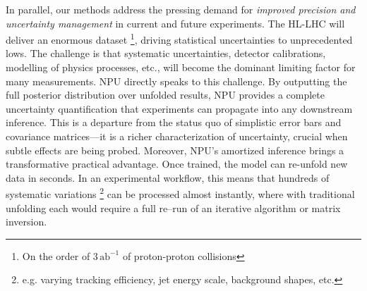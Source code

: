         In parallel, our methods address the pressing demand for \emph{improved precision and uncertainty management} in current and future experiments.
        The HL-LHC will deliver an enormous dataset \footnote{On the order of $3\,\text{ab}^{-1}$ of proton-proton collisions}, driving statistical uncertainties to unprecedented lows.
        The challenge is that systematic uncertainties, detector calibrations, modelling of physics processes, etc., will become the dominant limiting factor for many measurements.
        NPU directly speaks to this challenge.
        By outputting the full posterior distribution over unfolded results, NPU provides a complete uncertainty quantification that experiments can propagate into any downstream inference.
        This is a departure from the status quo of simplistic error bars and covariance matrices---it is a richer characterization of uncertainty, crucial when subtle effects are being probed.
        Moreover, NPU's amortized inference brings a transformative practical advantage.
        Once trained, the model can re-unfold new data in seconds.
        In an experimental workflow, this means that hundreds of systematic variations \footnote{e.g. varying tracking efficiency, jet energy scale, background shapes, etc.} can be processed almost instantly, where with traditional unfolding each would require a full re--run of an iterative algorithm or matrix inversion.
    
